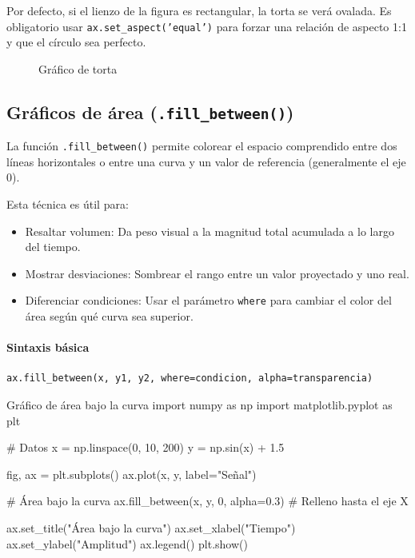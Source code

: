 \begin{nota}
Por defecto, si el lienzo de la figura es rectangular, la torta se verá ovalada. Es obligatorio usar \texttt{ax.set\_aspect('equal')} para forzar una relación de aspecto 1:1 y que el círculo sea perfecto.
\end{nota}

\begin{figure}[ht]
    \centering
     
    \caption{Gráfico de torta}
    \label{fig:grafico_torta_avanzado}
\end{figure}



\subsection{Gráficos de área (\texttt{.fill\_between()})}

La función \texttt{.fill\_between()} permite colorear el espacio comprendido entre dos líneas horizontales o entre una curva y un valor de referencia (generalmente el eje 0).

Esta técnica es útil para:
\begin{itemize}
\item Resaltar volumen: Da peso visual a la magnitud total acumulada a lo largo del tiempo.
\item Mostrar desviaciones: Sombrear el rango entre un valor proyectado y uno real.
\item Diferenciar condiciones: Usar el parámetro \texttt{where} para cambiar el color del área según qué curva sea superior.
\end{itemize}

\paragraph{Sintaxis básica}
\begin{verbatim}
ax.fill_between(x, y1, y2, where=condicion, alpha=transparencia)
\end{verbatim}

\begin{pycode}{Gráfico de área bajo la curva}
import numpy as np
import matplotlib.pyplot as plt

# Datos
x = np.linspace(0, 10, 200)
y = np.sin(x) + 1.5

fig, ax = plt.subplots()
ax.plot(x, y, label="Señal")

# Área bajo la curva
ax.fill_between(x, y, 0, alpha=0.3) # Relleno hasta el eje X

ax.set_title("Área bajo la curva")
ax.set_xlabel("Tiempo")
ax.set_ylabel("Amplitud")
ax.legend()
plt.show()
\end{pycode}

